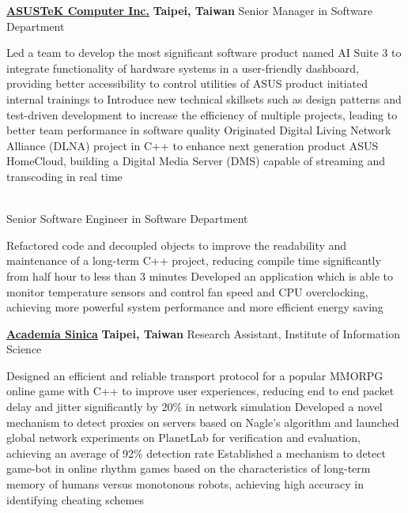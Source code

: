 \documentclass[a4paper,10pt,oneside]{article}
\begin{document}
\begin{body}
\SmallEntryGap
\href{http://www.asus.com/US/}
{\textbf{ASUSTeK Computer Inc.}}
\hfill
\textbf{Taipei, Taiwan}
Senior Manager in Software Department
\begin{detail}
\BulletItem
Led a team to develop the most significant software product named AI Suite 3 to integrate functionality of hardware systems in a user-friendly dashboard, providing better accessibility to control utilities of ASUS product
\BulletItem
initiated internal trainings to Introduce new technical skillsets such as design patterns and test-driven development to increase the efficiency of multiple projects, leading to better team performance in software quality
\BulletItem
Originated Digital Living Network Alliance (DLNA) project in C++ to enhance next generation product ASUS HomeCloud, building a Digital Media Server (DMS) capable of streaming and transcoding in real time
\end{detail}
\\[-2em]
Senior Software Engineer in Software Department
\begin{detail}
\BulletItem
Refactored code and decoupled objects to improve the readability and maintenance of a long-term C++ project, reducing compile time significantly from half hour to less than 3 minutes
\BulletItem
Developed an application which is able to monitor temperature sensors and control fan speed and CPU overclocking, achieving more powerful system performance and more efficient energy saving
\end{detail}

\SmallEntryGap
\href{http://www.iis.sinica.edu.tw/index_en.html}
{\textbf{Academia Sinica}}
\hfill
\textbf{Taipei, Taiwan}
Research Assistant, Institute of Information Science
\begin{detail}
\BulletItem
Designed an efficient and reliable transport protocol for a popular MMORPG online game with C++ to improve user experiences, reducing end to end packet delay and jitter significantly by 20\% in network simulation
\BulletItem
Developed a novel mechanism to detect proxies on servers based on Nagle's algorithm and launched global network experiments on PlanetLab for verification and evaluation, achieving an average of 92\% detection rate
\BulletItem
Established a mechanism to detect game-bot in online rhythm games based on the characteristics of long-term memory of humans versus monotonous robots, achieving high accuracy in identifying cheating schemes
\end{detail}


\end{body}
\end{document}
